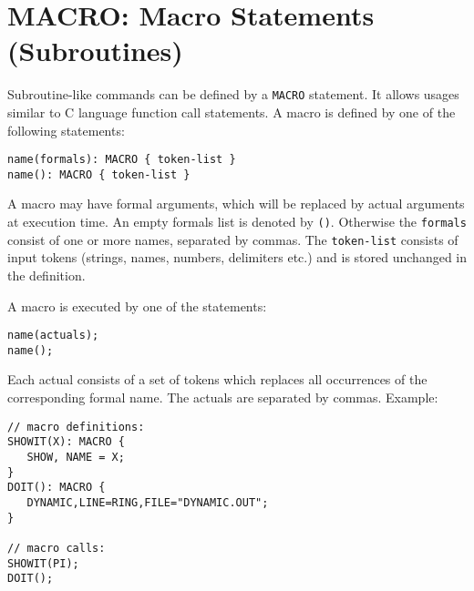 \section{MACRO: Macro Statements (Subroutines)}
\label{sec:macro}
Subroutine-like commands can be defined by a \texttt{MACRO} statement.
It allows usages similar to C language function call statements.
A macro is defined by one of the following statements:
\begin{verbatim}
name(formals): MACRO { token-list }
name(): MACRO { token-list }
\end{verbatim}
A macro may have formal arguments, which will be replaced by actual arguments 
at execution time. An empty formals list is denoted by \texttt{()}.
Otherwise the \texttt{formals} consist of one or more names, 
separated by commas.
The \texttt{token-list} consists of input tokens 
(strings, names, numbers, delimiters etc.) 
and is stored unchanged in the definition.

A macro is executed by one of the statements:
\begin{verbatim}
name(actuals);
name();
\end{verbatim}
Each actual consists of a set of tokens which replaces all occurrences of
the corresponding formal name.
The actuals are separated by commas.
\noindent Example:
\begin{verbatim}
// macro definitions:
SHOWIT(X): MACRO {
   SHOW, NAME = X;
}
DOIT(): MACRO {
   DYNAMIC,LINE=RING,FILE="DYNAMIC.OUT";
}

// macro calls:
SHOWIT(PI);
DOIT();
\end{verbatim}


